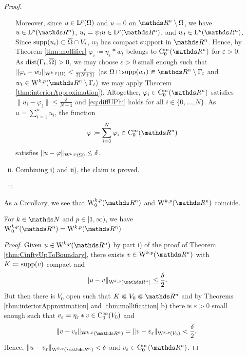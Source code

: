 \begin{proof}
\begin{enumerate}[i)]
      Moreover, since $u \in \mathrm{L}^p(\Omega)$ and $u = 0$ on $\R^n \setminus \Omega$, we have $u \in \Ell^p(\R^n)$, $u_i = \psi_i u \in \Ell^p(\R^n)$, and $w_t \in \Ell^p(\R^n)$.
      Since $\operatorname{supp}(u_i) \subset \overline \Omega \cap V_i$, $w_t$ has compact support in $\R^n$.
      Hence, by Theorem \ref{thm:mollifier} $\varphi_i \coloneqq \eta_\varepsilon \ast w_t$ belongs to $\CC_0^\infty(\R^n)$ for $\varepsilon > 0$.
      As $\operatorname{dist}(\Gamma_t , \overline\Omega) > 0$, we may choose $\varepsilon > 0$ small enough such that $\|\varphi_i - w_t \|_{\mathrm{W}^{k,p}(\Omega)} < \frac{\delta}{2(N+1)}$ (as $\Omega \cap \supp(w_t) \Subset \R^n \setminus \Gamma_t$ and $w_t \in \WW^{k,p}(\R^n \setminus \Gamma_t)$ we may apply Theorem \ref{thm:interiorApproximation}).
      Altogether, $\varphi_i \in \CC_0^\infty(\R^n)$ satisfies $\|u_i - \varphi_i\| \leq \frac{\delta}{N + 1}$ and \eqref{eq:diffUPhi} holds for all $i \in \{0,\dots,N\}$.
      As $u = \sum_{i = 1}^n u_i$, the function
      $$\varphi \coloneqq \sum_{i = 0}^N \varphi_i \in \CC_0^\infty(\R^n)$$
      satisfies $\| u - \varphi \|_{\mathrm{W}^{k,p}(\Omega)} \leq \delta$.
    \item Combining i) and ii), the claim is proved.  \qedhere
  \end{enumerate}
\end{proof}

As a Corollary, we see that $\WW_0^{k,p}(\R^n)$ and $\WW^{k,p}(\R^n)$ coincide.

\begin{cor}
  \label{cor:W0andWcoincide}
  For $k \in \N$ and $p \in [1,\infty)$, we have $\WW_0^{k,p}(\R^n) = \WW^{k,p}(\R^n)$.
\end{cor}

\begin{proof}
  Given $u \in \WW^{k,p}(\R^n)$ by part i) of the proof of Theorem \ref{thm:CinftyUpToBoundary}, there exists $v \in\WW^{k,p}(\R^n)$ with $K\coloneqq \operatorname{supp}(v)$ compact and $$\|u - v\|_{\WW^{k,p}(\R^n)} \leq \frac{\delta}{2}.$$
  But then there is $V_0$ open such that $K \Subset V_0 \Subset \R^n$ and by Theorems \ref{thm:interiorApproximation} and \ref{thm:mollification} b) there is $\varepsilon > 0$ small enough such that $v_\varepsilon = \eta_\varepsilon \ast v \in \mathrm{C}_0^\infty(V_0)$ and 
  $$
  \|v - v_\varepsilon\|_{\WW^{k,p}(\R^n)} = \|v - v_\varepsilon\|_{\WW^{k,p}(V_0)} < \frac{\delta}{2}.
  $$
  Hence, $\|u - v_\varepsilon\|_{\WW^{k,p}(\R^n)} < \delta$ and $v_\varepsilon \in \CC_0^\infty(\R^n)$.
\end{proof}

